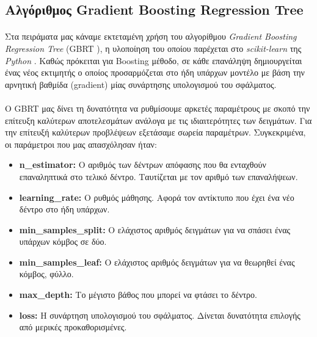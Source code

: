 \subsection{Αλγόριθμος Gradient Boosting Regression Tree}
\paragraph{}
Στα πειράματα μας κάναμε εκτεταμένη χρήση του αλγορίθμου \textit{Gradient Boosting Regression Tree} (GBRT \cite{GBRT}), η υλοποίηση του οποίου παρέχεται στο \textit{scikit-learn} της \textit{Python} \cite{scikit}. Καθώς πρόκειται για Boosting μέθοδο, σε κάθε επανάληψη δημιουργείται ένας νέος εκτιμητής ο οποίος προσαρμόζεται στο ήδη υπάρχων μοντέλο με βάση την αρνητική βαθμίδα (gradient) μίας συνάρτησης υπολογισμού του σφάλματος. 
\paragraph{}
O GBRT μας δίνει τη δυνατότητα να ρυθμίσουμε αρκετές παραμέτρους με σκοπό την επίτευξη καλύτερων αποτελεσμάτων ανάλογα με τις ιδιαιτερότητες των δειγμάτων. Για την επίτευξή καλύτερων προβλέψεων εξετάσαμε σωρεία παραμέτρων. Συγκεκριμένα, οι παράμετροι που μας απασχόλησαν ήταν:
\begin{itemize}
\item[] \textbf{n\_estimator:} Ο αριθμός των δέντρων απόφασης που θα ενταχθούν επαναληπτικά στο τελικό δέντρο. Ταυτίζεται με τον αριθμό των επαναλήψεων.
\item[] \textbf{learning\_rate:} Ο ρυθμός μάθησης. Αφορά τον αντίκτυπο που έχει ένα νέο δέντρο στο ήδη υπάρχων.

\item[] \textbf{min\_samples\_split:} Ο ελάχιστος αριθμός δειγμάτων για να σπάσει ένας υπάρχων κόμβος σε δύο.

\item[] \textbf{min\_samples\_leaf:} Ο ελάχιστος αριθμός δειγμάτων για να θεωρηθεί ένας κόμβος, φύλλο.

\item[] \textbf{max\_depth:} Το μέγιστο βάθος που μπορεί να φτάσει το δέντρο.

\item[] \textbf{loss:} Η συνάρτηση υπολογισμού του σφάλματος. Δίνεται δυνατότητα επιλογής από μερικές προκαθορισμένες. 
\end{itemize}

